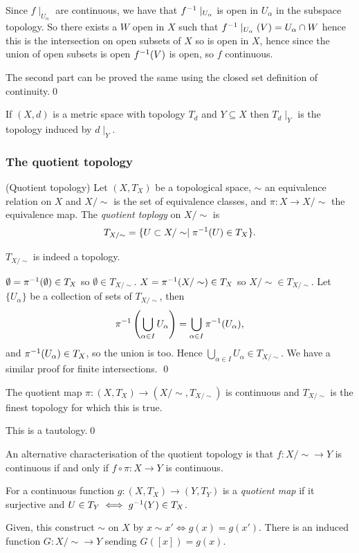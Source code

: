 \documentclass{article}
\begin{document}
Since $ f\mid_{U_\alpha} $ are continuous, we have that $ {f}^{-1}\mid_{U_\alpha} $ is open in $ U_\alpha $ in the subspace topology. So there exists a $ W $ open in $ X $ such that $ {f}^{-1}\mid_{U_\alpha}(V) = U_\alpha \cap W $ hence this is the intersection on open subsets of $ X $ so is open in $ X $, hence since the union of open subsets is open $ {f}^{-1}(V) $ is open, so $ f $ continuous.\par
The second part can be proved the same using the closed set definition of continuity.\qed
\par
If $ (X,d) $ is a metric space with topology $ T_d $ and $ Y\subseteq X $ then $ T_d\mid_Y $ is the topology induced by $ d\mid_Y $.\par
\subsubsection{The quotient topology}
\begin{definition}
	(Quotient topology) Let $ (X,T_X) $ be a topological space, $ \sim $ an equivalence relation on $ X $ and $ X/\sim $ is the set of equivalence classes, and $ \pi:X\to X/\sim $ the equivalence map. The \textit{quotient toplogy} on $ X/\sim $ is
	\[
		T_{X/\sim} = \{U\subset X/\sim \mid {\pi}^{-1} (U)\in T_X\}.
	\]
\end{definition}
\begin{proposition}
	$ T_{X/\sim} $ is indeed a topology.
\end{proposition}
\pf $ \emptyset = {\pi}^{-1}(\emptyset)\in T_X $ so $ \emptyset \in T_{X/\sim} $. $ X={\pi}^{-1}(X/\sim)\in T_X $ so $ X/\sim \in T_{X/\sim} $. Let $ \{U_\alpha\} $ be a collection of sets of $ T_{X/\sim} $, then
\[
	{\pi}^{-1}\left(\bigcup_{\alpha\in I}U_\alpha\right) = \bigcup_{\alpha\in I}{\pi}^{-1} (U_\alpha),
\]
and $ {\pi}^{-1}(U_\alpha)\in T_X $, so the union is too. Hence $ \bigcup_{\alpha\in I}U_\alpha\in T_{X/\sim} $. We have a similar proof for finite intersections. \qed
\begin{proposition}
	The quotient map $ \pi:(X,T_X)\to (X/\sim, T_{X/\sim}) $ is continuous and $ T_{X/\sim} $ is the finest topology for which this is true.
\end{proposition}
\pf This is a tautology.\qed
\par
An alternative characterisation of the quotient topology is that $ f:X/\sim \to Y $ is continuous if and only if $ f\circ \pi:X\to Y $ is continuous.
\begin{definition}
	For a continuous function $ g:(X,T_X)\to (Y,T_Y) $ is a \textit{quotient map} if it surjective and $ U\in T_Y \iff {g}^{-1}(Y)\in T_X$.\par
	Given, this construct $ \sim $ on $ X $ by $ x\sim x' \iff g(x)=g(x')$. There is an induced function $ G:X/\sim \to Y $ sending $ G([x]) = g(x) $. 
\end{definition}
\end{document}
